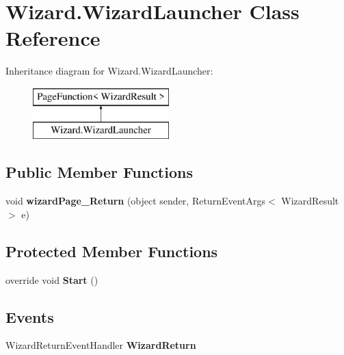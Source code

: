 \hypertarget{class_wizard_1_1_wizard_launcher}{}\section{Wizard.\+Wizard\+Launcher Class Reference}
\label{class_wizard_1_1_wizard_launcher}
Inheritance diagram for Wizard.\+Wizard\+Launcher\+:\begin{figure}[H]
\begin{center}
\leavevmode
\includegraphics[height=2.000000cm]{class_wizard_1_1_wizard_launcher}
\end{center}
\end{figure}
\subsection*{Public Member Functions}
\begin{DoxyCompactItemize}
\item 
\mbox{\label{class_wizard_1_1_wizard_launcher_a78bed6b60e2bac289fa3815982f3b30f}} 
void {\bfseries wizard\+Page\+\_\+\+Return} (object sender, Return\+Event\+Args$<$ Wizard\+Result $>$ e)
\end{DoxyCompactItemize}
\subsection*{Protected Member Functions}
\begin{DoxyCompactItemize}
\item 
\mbox{\label{class_wizard_1_1_wizard_launcher_a9e6920c61becaa61c5482daac33339c5}} 
override void {\bfseries Start} ()
\end{DoxyCompactItemize}
\subsection*{Events}
\begin{DoxyCompactItemize}
\item 
\mbox{\label{class_wizard_1_1_wizard_launcher_a17588d6769064bbe93a042dbcd12deff}} 
Wizard\+Return\+Event\+Handler {\bfseries Wizard\+Return}
\end{DoxyCompactItemize}


